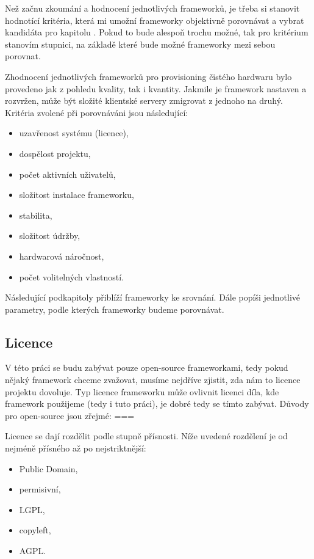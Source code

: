 \documentclass[thesis=B,czech]{FITthesis}[2012/06/26]
\begin{document}
Než začnu zkoumání a hodnocení jednotlivých frameworků, je třeba si stanovit hodnotící kritéria, která mi umožní frameworky objektivně porovnávat a vybrat kandidáta pro kapitolu . Pokud to bude alespoň trochu možné, tak pro kritérium stanovím stupnici, na základě které bude možné frameworky mezi sebou porovnat.


Zhodnocení jednotlivých frameworků pro provisioning čistého hardwaru bylo provedeno jak z pohledu kvality, tak i kvantity. Jakmile je framework nastaven a rozvržen, může být složité klientské servery zmigrovat z jednoho na druhý. Kritéria zvolené při porovnáváni jsou následující:


\begin{itemize}
\item uzavřenost systému (licence),
\item dospělost projektu,
\item počet aktivních uživatelů,
\item složitost instalace frameworku,
\item stabilita,
\item složitost údržby,
\item hardwarová náročnost,
\item počet volitelných vlastností.
\end{itemize}

Následující podkapitoly přiblíží frameworky ke srovnání. Dále popíši jednotlivé parametry, podle kterých frameworky budeme porovnávat.

\subsection{Licence}

V této práci se budu zabývat pouze open-source frameworkami, tedy pokud nějaký framework chceme zvažovat, musíme nejdříve zjistit, zda nám to licence projektu dovoluje. Typ licence frameworku může ovlivnit licenci díla, kde framework použijeme (tedy i tuto práci), je dobré tedy se tímto zabývat. Důvody pro open-source jsou zřejmé: ===

Licence se dají rozdělit podle stupně přísnosti. Níže uvedené rozdělení je od nejméně přísného až po nejstriktnější:

\begin{itemize}
\item Public Domain,
\item permisivní,
\item LGPL,
\item copyleft,
\item AGPL.
\end{itemize}
\end{document}
